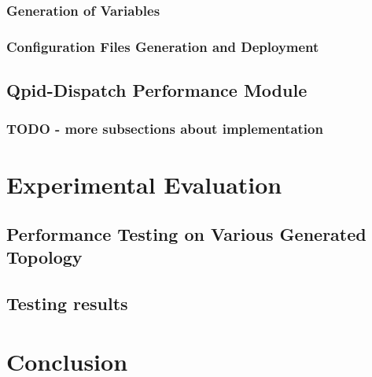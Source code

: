 \subsection{Generation of Variables}

\subsection{Configuration Files Generation and Deployment}

\section{Qpid-Dispatch Performance Module}

\subsection{TODO - more subsections about implementation}

\chapter{Experimental Evaluation}
\label{Experimental Evaluation}

\section{Performance Testing on Various Generated Topology}

\section{Testing results}

\chapter{Conclusion}
\label{Conclusion}
